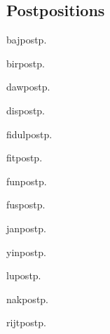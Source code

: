 \begin{multicols*}{2}
\section{Postpositions}

\begin{description}[leftmargin=*,labelwidth=*]
    \begin{dictentry}{baj}{postp.}
    \end{dictentry}
    \begin{dictentry}{bir}{postp.}
    \end{dictentry}
    \begin{dictentry}{daw}{postp.}
    \end{dictentry}
    \begin{dictentry}{dis}{postp.}
    \end{dictentry}
    \begin{dictentry}{fidul}{postp.}
    \end{dictentry}
    \begin{dictentry}{fit}{postp.}
    \end{dictentry}
    \begin{dictentry}{fun}{postp.}
    \end{dictentry}
    \begin{dictentry}{fus}{postp.}
    \end{dictentry}
    \begin{dictentry}{jan}{postp.}
    \end{dictentry}
    \begin{dictentry}{yin}{postp.}
    \end{dictentry}
    \begin{dictentry}{lu}{postp.}
    \end{dictentry}
    \begin{dictentry}{nak}{postp.}
    \end{dictentry}
    \begin{dictentry}{rijt}{postp.}

\end{dictentry}
\end{description}
\end{multicols*}
